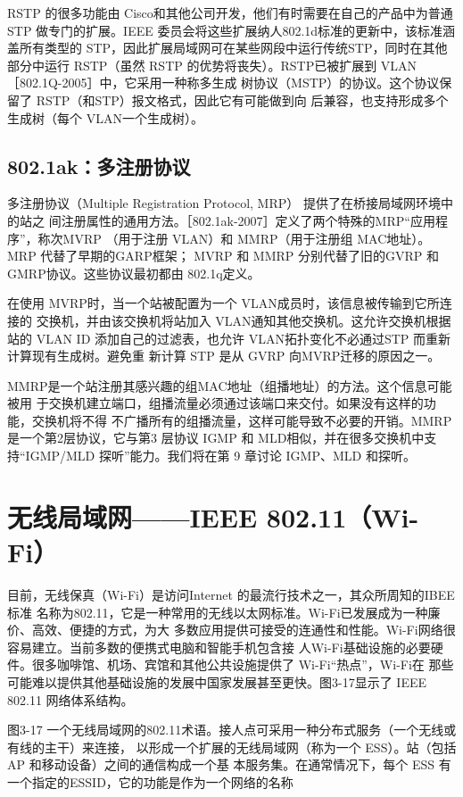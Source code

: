 RSTP 的很多功能由 Cisco和其他公司开发，他们有时需要在自己的产品中为普通STP
做专门的扩展。IEEE 委员会将这些扩展纳人802.1d标准的更新中，该标准涵盖所有类型的
STP，因此扩展局域网可在某些网段中运行传统STP，同时在其他部分中运行 RSTP（虽然
RSTP 的优势将丧失）。RSTP已被扩展到 VLAN［802.1Q-2005］中，它采用一种称多生成
树协议（MSTP）的协议。这个协议保留了 RSTP（和STP）报文格式，因此它有可能做到向
后兼容，也支持形成多个生成树（每个 VLAN一个生成树）。

\subsection{802.1ak：多注册协议}

多注册协议（Multiple Registration Protocol, MRP） 提供了在桥接局域网环境中的站之
间注册属性的通用方法。［802.1ak-2007］定义了两个特殊的MRP“应用程序”，称次MVRP
（用于注册 VLAN）和 MMRP（用于注册组 MAC地址）。MRP 代替了早期的GARP框架；
MVRP 和 MMRP 分别代替了旧的GVRP 和GMRP协议。这些协议最初都由 802.1q定义。

在使用 MVRP时，当一个站被配置为一个 VLAN成员时，该信息被传输到它所连接的
交换机，并由该交换机将站加入 VLAN通知其他交换机。这允许交换机根据站的 VLAN ID
添加自己的过滤表，也允许 VLAN拓扑变化不必通过STP 而重新计算现有生成树。避免重
新计算 STP 是从 GVRP 向MVRP迁移的原因之一。

MMRP是一个站注册其感兴趣的组MAC地址（组播地址）的方法。这个信息可能被用
于交换机建立端口，组播流量必须通过该端口来交付。如果没有这样的功能，交换机将不得
不广播所有的组播流量，这样可能导致不必要的开销。MMRP是一个第2层协议，它与第3
层协议 IGMP 和 MLD相似，并在很多交换机中支持“IGMP/MLD 探听”能力。我们将在第
9 章讨论 IGMP、MLD 和探听。

\section{无线局域网——IEEE 802.11（Wi-Fi）}

目前，无线保真（Wi-Fi）是访问Internet 的最流行技术之一，其众所周知的IBEE 标准
名称为802.11，它是一种常用的无线以太网标准。Wi-Fi已发展成为一种廉价、高效、便捷的方式，为大
多数应用提供可接受的连通性和性能。Wi-Fi网络很容易建立。当前多数的便携式电脑和智能手机包含接
人Wi-Fi基础设施的必要硬件。很多咖啡馆、机场、宾馆和其他公共设施提供了 Wi-Fi“热点”，Wi-Fi在
那些可能难以提供其他基础设施的发展中国家发展甚至更快。图3-17显示了 IEEE 802.11 网络体系结构。

图3-17 一个无线局域网的802.11术语。接人点可采用一种分布式服务（一个无线或有线的主干）来连接，
以形成一个扩展的无线局域网（称为一个 ESS）。站（包括AP 和移动设备）之间的通信构成一个基
本服务集。在通常情况下，每个 ESS 有一个指定的ESSID，它的功能是作为一个网络的名称

